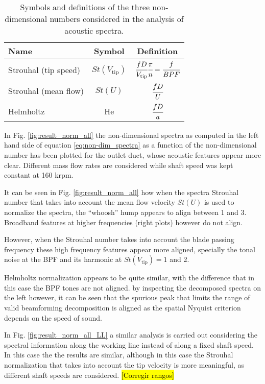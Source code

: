 \begin{table}
\centering
\caption{Symbols and definitions of the three non-dimensional numbers considered in the analysis of acoustic spectra.}
\footnotesize
\begin{tabular}{lcc}
\toprule
\textbf{Name} & \textbf{Symbol} & \textbf{Definition}\\\midrule
Strouhal (tip speed)& $St(V_\text{tip})$ & $\cfrac{f D}{V_\text{tip}}\cfrac{\pi}{n}=\cfrac{f}{BPF}$ \\[4mm]
Strouhal (mean flow) & $St(U)$ & $\cfrac{f D}{U}$ \\[4mm]
Helmholtz & He & $\cfrac{f D}{a}$ \\[2mm] \bottomrule
\end{tabular}
\label{tab:nondim_numbers}
\end{table}

In Fig. \ref{fig:result_norm_all} the non-dimensional spectra as computed in the left hand side of equation \ref{eq:non-dim_spectra} as a function of the non-dimensional number has been plotted for the outlet duct, whose acoustic features appear more clear. Different mass flow rates are considered while shaft speed was kept constant at 160 krpm. 

It can be seen in Fig. \ref{fig:result_norm_all} how when the spectra Strouhal number that takes into account the mean flow velocity $St(U)$ is used to normalize the spectra, the ``whoosh'' hump appears to align between 1 and 3. Broadband features at higher frequencies (right plots) however do not align.

However, when the Strouhal number takes into account the blade passing frequency these high frequency features appear more aligned, specially the tonal noise at the BPF and its harmonic at $St(V_\text{tip})=1$ and 2. 

Helmholtz normalization appears to be quite similar, with the difference that in this case the BPF tones are not aligned. by inspecting the decomposed spectra on the left however, it can be seen that the spurious peak that limits the range of valid beamforming decomposition is aligned as the spatial Nyquist criterion depends on the speed of sound.

In Fig. \ref{fig:result_norm_all_LL} a similar analysis is carried out considering the spectral information along the working line instead of along a fixed shaft speed. In this case the the results are similar, although in this case the Strouhal normalization that takes into account the tip velocity is more meaningful, as different shaft speeds are considered. \hl{[Corregir rangos]}


